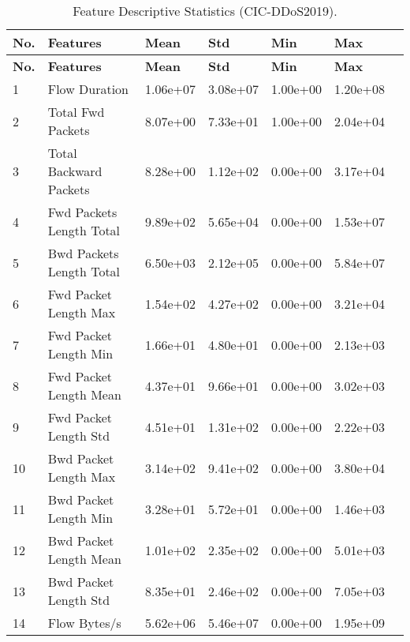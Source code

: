 \begin{center}
    \begin{longtable}{|l|l|l|l|l|l|l|}
        \caption{Feature Descriptive Statistics (CIC-DDoS2019).} \\
        \hline
        \textbf{No.} & \textbf{Features} & \textbf{Mean} & \textbf{Std} & \textbf{Min} & \textbf{Max} \\
        \hline
        \endfirsthead

        \hline
        \textbf{No.} & \textbf{Features} & \textbf{Mean} & \textbf{Std} & \textbf{Min} & \textbf{Max} \\
        \hline
        \endhead

        1 & Flow Duration & 1.06e+07 & 3.08e+07 & 1.00e+00 & 1.20e+08 \\
        \hline
        2 & Total Fwd Packets & 8.07e+00 & 7.33e+01 & 1.00e+00 & 2.04e+04 \\
        \hline
        3 & Total Backward Packets & 8.28e+00 & 1.12e+02 & 0.00e+00 & 3.17e+04 \\
        \hline
        4 & Fwd Packets Length Total & 9.89e+02 & 5.65e+04 & 0.00e+00 & 1.53e+07 \\
        \hline
        5 & Bwd Packets Length Total & 6.50e+03 & 2.12e+05 & 0.00e+00 & 5.84e+07 \\
        \hline
        6 & Fwd Packet Length Max & 1.54e+02 & 4.27e+02 & 0.00e+00 & 3.21e+04 \\
        \hline
        7 & Fwd Packet Length Min & 1.66e+01 & 4.80e+01 & 0.00e+00 & 2.13e+03 \\
        \hline
        8 & Fwd Packet Length Mean & 4.37e+01 & 9.66e+01 & 0.00e+00 & 3.02e+03 \\
        \hline
        9 & Fwd Packet Length Std & 4.51e+01 & 1.31e+02 & 0.00e+00 & 2.22e+03 \\
        \hline
        10 & Bwd Packet Length Max & 3.14e+02 & 9.41e+02 & 0.00e+00 & 3.80e+04 \\
        \hline
        11 & Bwd Packet Length Min & 3.28e+01 & 5.72e+01 & 0.00e+00 & 1.46e+03 \\
        \hline
        12 & Bwd Packet Length Mean & 1.01e+02 & 2.35e+02 & 0.00e+00 & 5.01e+03 \\
        \hline
        13 & Bwd Packet Length Std & 8.35e+01 & 2.46e+02 & 0.00e+00 & 7.05e+03 \\
        \hline
        14 & Flow Bytes/s & 5.62e+06 & 5.46e+07 & 0.00e+00 & 1.95e+09 \\
        \hline

\end{longtable}
\end{center}
